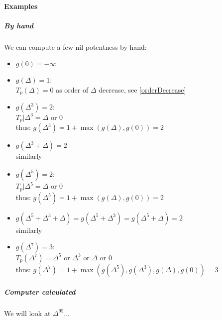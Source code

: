 \paragraph{Examples}
\subparagraph{By hand}
We can compute a few nil potentness by hand:
\begin{itemize}
	\item $g(0) = -\infty$
	
	\item $g(\Delta) = 1$:\\
	$
	T_p(\Delta) = 0
	$
	as order of $\Delta$ decrease, see \ref{orderDecrease}
	
	\item $g(\Delta^3) = 2$:\\
	$
	T_p|\Delta^3 = \Delta \text{ or } 0
	$\\
	thus:
	$
	g(\Delta^3) = 1 + \max(g(\Delta), g(0)) = 2
	$
	
	\item $g(\Delta^3+\Delta) = 2$\\
	similarly
	
	\item $g(\Delta^5) = 2$:\\
	$
	T_p|\Delta^5 = \Delta \text{ or } 0
	$\\
	thus:
	$
	g(\Delta^5) = 1 + \max(g(\Delta), g(0)) = 2
	$
	
	\item $g(\Delta^5+\Delta^3+\Delta) = g(\Delta^5+\Delta^3) = g(\Delta^5+\Delta) = 2$\\
	similarly
	
	\item $g(\Delta^7) = 3$:\\
	$
	T_p(\Delta^7) = \Delta^5 \text{ or } \Delta^3 \text{ or }  \Delta \text{ or } 0
	$\\
	thus:
	$
	g(\Delta^7) = 1 + \max(g(\Delta^5), g(\Delta^3), g(\Delta), g(0)) = 3
	$
\end{itemize}



\subparagraph{Computer calculated}
We will look at $\Delta^{95}$...


